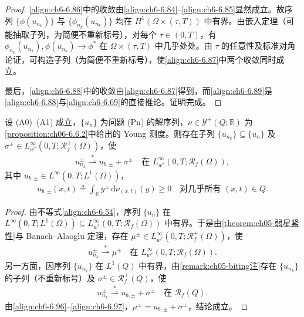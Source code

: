 \documentclass[../../main.tex]{subfiles}%
\begin{document}
\begin{proof}
\eqref{align:ch6-6.86}中的收敛由\eqref{align:ch6-6.84}--\eqref{align:ch6-6.85}显然成立。故序列 $\{\phi(u_{n_k})\}$ 与 $\{\phi_{n_k}(u_{n_k})\}$ 均在 $H^1(\Omega\times(\tau,T))$ 中有界。由嵌入定理（可能抽取子列，为简便不重新标号），对每个 $\tau\in(0,T)$，有 $\phi_{n_k}(u_{n_k}),\phi(u_{n_k})\to\phi^*$ 在 $\Omega\times(\tau,T)$ 中几乎处处。由 $\tau$ 的任意性及标准对角论证，可构造子列（为简便不重新标号），使\eqref{align:ch6-6.87}中两个收敛同时成立。

最后，\eqref{align:ch6-6.88}中的收敛由\eqref{align:ch6-6.87}得到，而\eqref{align:ch6-6.89}是\eqref{align:ch6-6.88}与\eqref{align:ch6-6.69}的直接推论。证明完成。
\end{proof}

\begin{proposition}\label{proposition:ch06-6.6.3}
设 (A0)--(A1) 成立，$\{u_n\}$ 为问题 (Pn) 的解序列，$\nu\in\mathcal{Y}^+(Q;\mathbb{R})$ 为\cref{proposition:ch06-6.6.2}中给出的 Young 测度。则存在子列 $\{u_{n_k}\}\subseteq\{u_n\}$ 及 $\sigma^\pm\in L^\infty_{w^*}(0,T;\mathscr{R}^+_f(\Omega))$，使
\begin{align}
u^\pm_{n_k}\stackrel{*}{\rightharpoonup}u_{b,\pm}+\sigma^\pm
\quad\text{在 }L^\infty_{w^*}(0,T;\mathscr{R}_f(\Omega)), \label{align:ch6-6.94}
\end{align}
其中 $u_{b,\pm}\in L^\infty(0,T;L^1(\Omega))$，
\begin{align}
u_{b,\pm}(x,t)\triangleq \int_\mathbb{R}y^\pm\,\mathrm{d}\nu_{(x,t)}(y)\geqslant0
\quad\text{对几乎所有 }(x,t)\in Q. \label{align:ch6-6.95}
\end{align}
\end{proposition}

\begin{proof}
由不等式\eqref{align:ch6-6.54}，序列 $\{u_n\}$ 在 $L^\infty(0,T;L^1(\Omega))\subseteq L^\infty_{w^*}(0,T;\mathscr{R}_f(\Omega))$ 中有界。于是由\cref{theorem:ch05-弱星紧性}与 Banach--Alaoglu 定理，存在 $\mu^\pm\in L^\infty_{w^*}(0,T;\mathscr{R}^+_f(\Omega))$，使
\begin{align}
u^\pm_{n_k}\stackrel{*}{\rightharpoonup}\mu^\pm
\quad\text{在 }L^\infty_{w^*}(0,T;\mathscr{R}_f(\Omega)). \label{align:ch6-6.96}
\end{align}
另一方面，因序列 $\{u_{n_k}\}$ 在 $L^1(Q)$ 中有界，由\cref{remark:ch05-biting注}存在 $\{u_{n_k}\}$ 的子列（不重新标号）及 $\sigma^\pm\in\mathscr{R}^+_f(Q)$，使
\begin{align}
u^\pm_{n_k}\stackrel{*}{\rightharpoonup}u_{b,\pm}+\sigma^\pm
\quad\text{在 }\mathscr{R}_f(Q). \label{align:ch6-6.97}
\end{align}
由\eqref{align:ch6-6.96}--\eqref{align:ch6-6.97}，$\mu^\pm=u_{b,\pm}+\sigma^\pm$，结论成立。
\end{proof}
\end{document}
